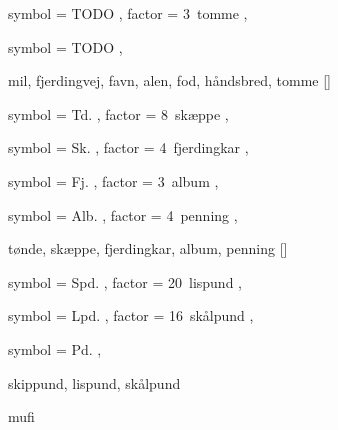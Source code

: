  {
	symbol = { TODO } ,
	factor = { 3~tomme } ,
}

 {
	symbol = { TODO } ,
}

 {
	mil,
	fjerdingvej,
	favn,
	alen,
	fod,
	håndsbred,
	tomme
}[\alen]


 {
	symbol = { Td. } ,
	factor = { 8~skæppe } ,
}

 {
	symbol = { Sk. } ,
	factor = { 4~fjerdingkar } ,
}

 {
	symbol = { Fj. } ,
	factor = { 3~album } ,
}

 {
	symbol = { Alb. } ,
	factor = { 4~penning } ,
}

 {
	tønde,
	skæppe,
	fjerdingkar,
	album,
	penning
}[\hartkorn]


 {
	symbol = { Spd. } ,
	factor = { 20~lispund } ,
}

 {
	symbol = { Lpd. } ,
	factor = { 16~skålpund } ,
}

 {
	symbol = { Pd. } ,
}

 {
	skippund,
	lispund,
	skålpund
}


\ifcsname mufi\endcsname%
\fi